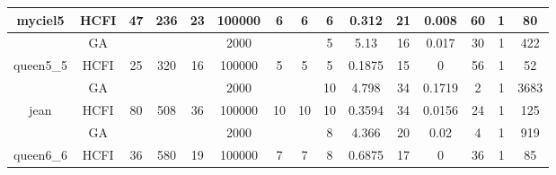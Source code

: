 \documentclass[10pt]{article}
\begin{document}
\begin{center}
\begin{table}[H]
\begin{tabular}{|c|c|c|c|c|c|c|c|c|c|c|c|c|c|c|}
 \multirow{-2}{*}{myciel5} &HCFI   &\multirow{-2}{*}{47}   &\multirow{-2}{*}{236}     &\multirow{-2}{*}{23}     &100000     &\multirow{-2}{*}{\cellcolor{yellow}6}      & \multirow{-2}{*}{\cellcolor{yellow}6}    &{\cellcolor{green}6}     &0.312         &21     &0.008         &60    &1     &80        \\ \hline \hline
	&GA&       &                   &                     &2000         &     \cellcolor{yellow} & {\cellcolor{yellow}}& {{\cellcolor{green}5}}
&5.13   &16         &0.017                   & 30                   & 1         &422        \\ \cline{2-2} \cline{6-6} \cline{9-15}
 \multirow{-2}{*}{queen5\_5} &HCFI   &\multirow{-2}{*}{25}   &\multirow{-2}{*}{320}     &\multirow{-2}{*}{16}     &100000     &\multirow{-2}{*}{\cellcolor{yellow}5}      & \multirow{-2}{*}{\cellcolor{yellow}5}    &{\cellcolor{green}5}     &0.1875          &15    &0         &56    &1     &52        \\ \hline \hline
	&GA&       &                   &                     &2000         &     \cellcolor{yellow} & {\cellcolor{yellow}}& {{\cellcolor{green}10}}
&4.798   &34        & 0.1719                  &2                    &1          &3683         \\ \cline{2-2} \cline{6-6} \cline{9-15}
 \multirow{-2}{*}{jean} &HCFI   &\multirow{-2}{*}{80}   &\multirow{-2}{*}{508}     &\multirow{-2}{*}{36}     &100000     &\multirow{-2}{*}{\cellcolor{yellow}10}      & \multirow{-2}{*}{\cellcolor{yellow}10}    &{\cellcolor{green}10}     &0.3594         &34    &0.0156         &24    &1     & 125       \\ \hline \hline
	&GA&       &                   &                     &2000         &     \cellcolor{yellow} & {\cellcolor{yellow}}& {{\cellcolor{green}8}}
&4.366   &20        & 0.02                  &4                    & 1         & 919       \\ \cline{2-2} \cline{6-6} \cline{9-15}
 \multirow{-2}{*}{queen6\_6} &HCFI   &\multirow{-2}{*}{36}   &\multirow{-2}{*}{580}     &\multirow{-2}{*}{19}     &100000     &\multirow{-2}{*}{\cellcolor{yellow}7}      & \multirow{-2}{*}{\cellcolor{yellow}7}    &{\cellcolor{green}8}     &0.6875         &17    & 0        &36    &1     &       85 \\ \hline \hline

\end{tabular}
\end{table}
\end{center}
\end{document}

